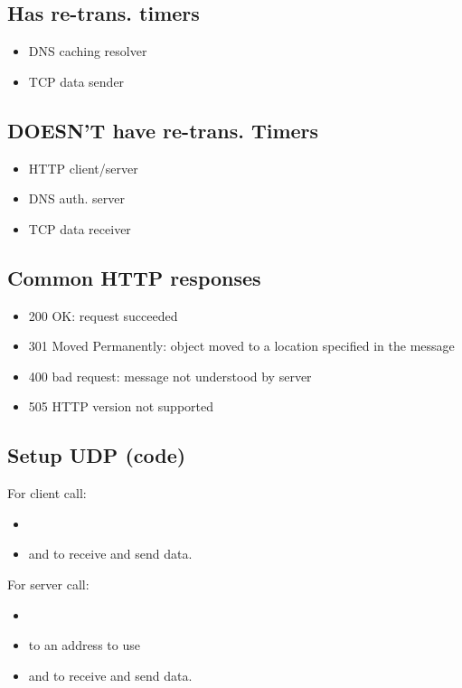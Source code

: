 \subsection*{Has re-trans. timers}
\begin{itemize}[itemsep=0em]
  \item DNS caching resolver
  \item TCP data sender
\end{itemize}
\subsection*{DOESN'T have re-trans. Timers}
\begin{itemize}[itemsep=0em]
  \item HTTP client/server
  \item DNS auth. server
  \item TCP data receiver
\end{itemize}
\subsection*{Common HTTP responses}
\begin{itemize}[itemsep=0em]
  \item 200 OK: request succeeded
  \item 301 Moved Permanently: object moved to a location specified in the message
  \item 400 bad request: message not understood by server
  \item 505 HTTP version not supported
\end{itemize}
\subsection*{Setup UDP (code)}
For client call:
\begin{footnotesize}
  \begin{itemize}[itemsep=-0.5em]
    \item {}
    \item {} and  to receive and send data.
  \end{itemize}
\end{footnotesize}
For server call:
\begin{footnotesize}
  \begin{itemize}[itemsep=-0.5em]
    \item {}
    \item {} to an address to use
    \item {} and  to receive and send data.
  \end{itemize}
\end{footnotesize}
